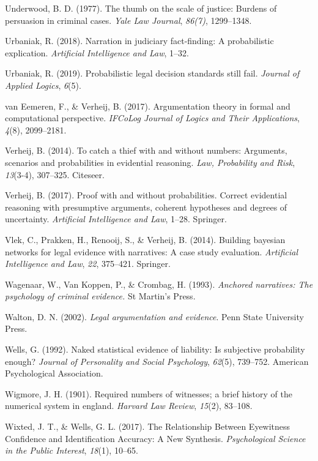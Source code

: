 \documentclass[11pt,dvipsnames,enabledeprecatedfontcommands]{scrartcl}
\begin{document}
\leavevmode\hypertarget{ref-Underwood1977The-thumb-on-th}{}%
Underwood, B. D. (1977). The thumb on the scale of justice: Burdens of
persuasion in criminal cases. \emph{Yale Law Journal}, \emph{86(7)},
1299--1348.

\leavevmode\hypertarget{ref-urbaniak2018narration}{}%
Urbaniak, R. (2018). Narration in judiciary fact-finding: A
probabilistic explication. \emph{Artificial Intelligence and Law},
1--32.

\leavevmode\hypertarget{ref-Urbaniak2019standards2}{}%
Urbaniak, R. (2019). Probabilistic legal decision standards still fail.
\emph{Journal of Applied Logics}, \emph{6}(5).

\leavevmode\hypertarget{ref-vanEemeren2017}{}%
van Eemeren, F., \& Verheij, B. (2017). Argumentation theory in formal
and computational perspective. \emph{IFCoLog Journal of Logics and Their
Applications}, \emph{4}(8), 2099--2181.

\leavevmode\hypertarget{ref-verheij2014catch}{}%
Verheij, B. (2014). To catch a thief with and without numbers:
Arguments, scenarios and probabilities in evidential reasoning.
\emph{Law, Probability and Risk}, \emph{13}(3-4), 307--325. Citeseer.

\leavevmode\hypertarget{ref-verheijproof2017}{}%
Verheij, B. (2017). Proof with and without probabilities. Correct
evidential reasoning with presumptive arguments, coherent hypotheses and
degrees of uncertainty. \emph{Artificial Intelligence and Law}, 1--28.
Springer.

\leavevmode\hypertarget{ref-vlek2014building}{}%
Vlek, C., Prakken, H., Renooij, S., \& Verheij, B. (2014). Building
bayesian networks for legal evidence with narratives: A case study
evaluation. \emph{Artificial Intelligence and Law}, \emph{22}, 375--421.
Springer.

\leavevmode\hypertarget{ref-wagenaar1993anchored}{}%
Wagenaar, W., Van Koppen, P., \& Crombag, H. (1993). \emph{Anchored
narratives: The psychology of criminal evidence.} St Martin's Press.

\leavevmode\hypertarget{ref-Walton2002}{}%
Walton, D. N. (2002). \emph{Legal argumentation and evidence}. Penn
State University Press.

\leavevmode\hypertarget{ref-wells1992naked}{}%
Wells, G. (1992). Naked statistical evidence of liability: Is subjective
probability enough? \emph{Journal of Personality and Social Psychology},
\emph{62}(5), 739--752. American Psychological Association.

\leavevmode\hypertarget{ref-wigmore1901number}{}%
Wigmore, J. H. (1901). Required numbers of witnesses; a brief history of
the numerical system in england. \emph{Harvard Law Review},
\emph{15}(2), 83--108.

\leavevmode\hypertarget{ref-wixted2017RelationshipEyewitnessConfidence}{}%
Wixted, J. T., \& Wells, G. L. (2017). The Relationship Between
Eyewitness Confidence and Identification Accuracy: A New Synthesis.
\emph{Psychological Science in the Public Interest}, \emph{18}(1),
10--65.
\end{document}
